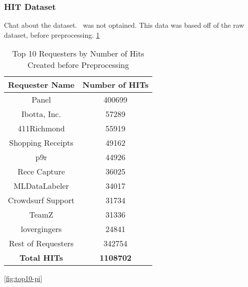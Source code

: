 \documentclass[letterpaper,12pt]{article}
\begin{document}
\subsubsection{HIT Dataset}
Chat about the dataset. \
was not optained. This data was based off of the raw dataset, before preprocessing.
\ref{tab:requester_top_10}
\begin{table}
	\caption{\label{tab:requester_top_10} Top 10 Requesters by Number of Hits Created before Preprocessing}
	\begin{center}
		\begin{tabular}{| c | c |}
			\hline
			\textbf{Requester Name} & \textbf{Number of HITs} \\
			\hline
			Panel              &          400699 \\
			\hline
			Ibotta, Inc.       &           57289 \\
			\hline
			411Richmond        &           55919 \\
			\hline
			Shopping Receipts  &           49162 \\
			\hline
			p9r                &           44926 \\
			\hline
			Rece Capture       &           36025 \\
			\hline
			MLDataLabeler      &           34017 \\
			\hline
			Crowdsurf Support  &           31734 \\
			\hline
			TeamZ              &           31336 \\
			\hline
			lovergingers       &           24841 \\
			\hline
			Rest of Requesters &          342754 \\
			\hline
			\textbf{Total HITs} & \textbf{1108702} \\
			\hline
			\end{tabular}
	\end{center}
\end{table}

\ref{fig:top10-pi}
\newpage
\end{document}
